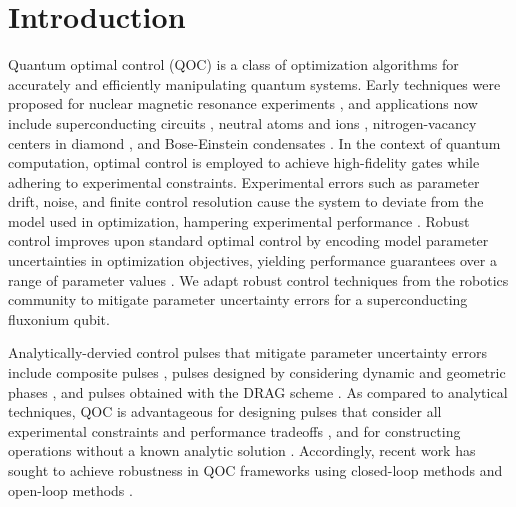 \section{Introduction}
Quantum optimal control (QOC) is a class of optimization
algorithms for accurately and efficiently manipulating quantum systems.
Early techniques were proposed for nuclear magnetic resonance experiments
\cite{vandersypen2005nmr, kehlet2004improving, khaneja2005optimal,
  maximov2008optimal, nielsen2010optimal, skinner2003application, tosner2009optimal},
and applications now include superconducting circuits \cite{abdelhafez2020universal,
  chakram2020multimode, egger2013optimized, fisher2010optimal, gokhale2019partial,
  huang2014optimal, heeres2017implementing, kelly2014optimal, leng2019robust,
  leung2017speedup, li2020fast,
  liebermann2016optimal, reinhold2019controlling,
  rebentrost2009optimal, rebentrost2009optimal2, spiteri2018quantum,
  sporl2007optimal},
neutral atoms and ions \cite{brouzos2015quantum,
  de2008optimal, grace2007optimal, goerz2011quantum, guo2019high, jensen2019time,
  larrouy2020fast, nebendahl2009optimal, omran2019generation,
  rosi2013fast,
  treutlein2006microwave, van2016optimal},
nitrogen-vacancy centers in diamond \cite{chou2015optimal,
  dolde2014high, geng2016experimental,
  nobauer2015smooth, poggiali2018optimal, rembold2020introduction, tian2019optimal},
and Bose-Einstein condensates \cite{amri2019optimal, doria2011optimal,
  sorensen2019qengine, sorensen2018quantum}.
In the context of quantum computation,
optimal control is employed to achieve high-fidelity gates
while adhering to experimental constraints.
Experimental errors such as parameter drift, noise, and
finite control resolution cause the system to deviate
from the model used in optimization, hampering
experimental performance
\cite{chakram2020multimode, heeres2017implementing, klimov2020snake,
  omran2019generation, reinhold2019controlling}.
Robust control improves upon
standard optimal control by encoding
model parameter uncertainties
in optimization objectives, yielding performance
guarantees over a range of parameter values \cite{Zhou97,Morimoto00,Manchester18}.
We adapt robust control techniques from the robotics community to mitigate
parameter uncertainty errors for
a superconducting fluxonium qubit.

Analytically-dervied control pulses that mitigate parameter uncertainty
errors include composite pulses \cite{cummins2000use, cummins2003tackling,
  kupce1995stretched, merrill2014progress},
pulses designed by considering dynamic and geometric phases
\cite{han2020experimental, xu2020nonadiabatic}, and
pulses obtained with the DRAG scheme \cite{motzoi2009simple}.
As compared to analytical techniques, QOC is advantageous for
designing pulses that consider all experimental constraints and
performance tradeoffs
\cite{leung2017speedup},
and for constructing operations without a known analytic solution
\cite{chakram2020multimode, heeres2017implementing}.
Accordingly, recent work has sought to achieve robustness in QOC
frameworks using closed-loop methods \cite{egger2014adaptive, feng2018gradient,
  li2017hybrid, wittler2020integrated} and open-loop methods \cite{
  allen2019robust, carvalho2020error, reinhold2019controlling,
  rembold2020introduction, kosut2013robust, niu2019universal}.

